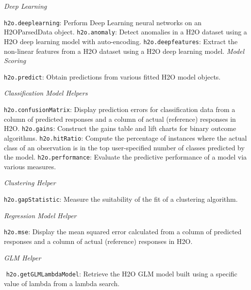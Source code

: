 \documentclass[11pt]{article}
\begin{document}
{{\emph{Deep Learning}\par
{\texttt{h2o.deeplearning}}: Perform Deep Learning neural networks on an H2OParsedData object.\newline
{\texttt{h2o.anomaly}}: Detect anomalies in a H2O dataset using a H2O deep learning model with auto-encoding.\newline
{\texttt{h2o.deepfeatures}}: Extract the non-linear features from a H2O dataset using a H2O deep learning model.\newline
\newpage
\emph{Model Scoring}\par
{\texttt{h2o.predict}}: Obtain predictions from various fitted H2O model objects.\newline

\emph{Classification Model Helpers}\par
{\texttt{h2o.confusionMatrix}}: Display prediction errors for classification data from a column of predicted responses and a column of actual (reference) responses in H2O.\newline
{\texttt{h2o.gains}}: Construct the gains table and lift charts for binary outcome algorithms.\newline
{\texttt{h2o.hitRatio}}: Compute the percentage of instances where the actual class of an observation is in the top user-specified number of classes predicted by the model.\newline
{\texttt{h2o.performance}}: Evaluate the predictive performance of a model via various measures.\newline

{\emph{Clustering Helper}}\par
{\texttt{h2o.gapStatistic}}: Measure the suitability of the fit of a clustering algorithm. \newline

\emph{Regression Model Helper}\par
{\texttt{h2o.mse}}: Display the mean squared error calculated from a column of predicted responses and a column of actual (reference) responses in H2O.\newline

\emph{GLM Helper}\par
 {\texttt{h2o.getGLMLambdaModel}}: Retrieve the H2O GLM model built using a specific value of lambda from a lambda search.\newline

}}
\end{document}
